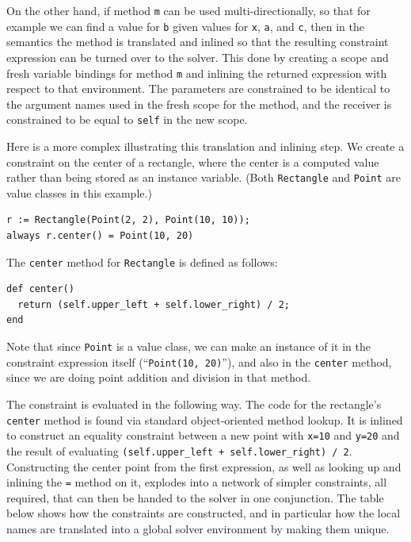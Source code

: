 On the other hand, if method \verb|m| can be used multi-directionally,
so that for example we can find a value for \verb|b| given values for
\verb|x|, \verb|a|, and \verb|c|, then in the semantics the method is
translated and inlined so that the resulting constraint expression can
be turned over to the solver.  This done by creating a scope and fresh
variable bindings for method \verb|m| and inlining the returned
expression with respect to that environment. The parameters are
constrained to be identical to the argument names used in the fresh
scope for the method, and the receiver is constrained to be equal to
\verb!self! in the new scope.

Here is a more complex illustrating this translation and inlining
step. We create a constraint on the center of a rectangle, where the
center is a computed value rather than being stored as an instance
variable.  (Both \verb!Rectangle! and \verb!Point! are value classes
in this example.)

\begin{lstlisting}
r := Rectangle(Point(2, 2), Point(10, 10));
always r.center() = Point(10, 20)
\end{lstlisting}

The \verb|center| method for \verb|Rectangle| is defined as follows:
\begin{lstlisting}
def center()
  return (self.upper_left + self.lower_right) / 2;
end
\end{lstlisting}

Note that since \verb|Point| is a value class, we can make an instance
of it in the constraint expression itself (``\verb|Point(10, 20)|''),
and also in the \verb|center| method, since we are doing point
addition and division in that method.

\begin{sloppypar}
The constraint is evaluated in the following way.  The code for the rectangle's
\verb|center| method is found via standard object-oriented method lookup.  It is
inlined to construct an equality constraint between a new point with
\verb|x=10| and \verb|y=20| and the result of evaluating
\verb|(self.upper_left + self.lower_right) / 2|. Constructing the center point
from the first expression, as well as looking up and inlining the \verb|=|
method on it, explodes into a network of simpler constraints, all required, that
can then be handed to the solver in one conjunction. The table below shows how
the constraints are constructed, and in particular how the local names are
translated into a global solver environment by making them unique.  
\end{sloppypar}

